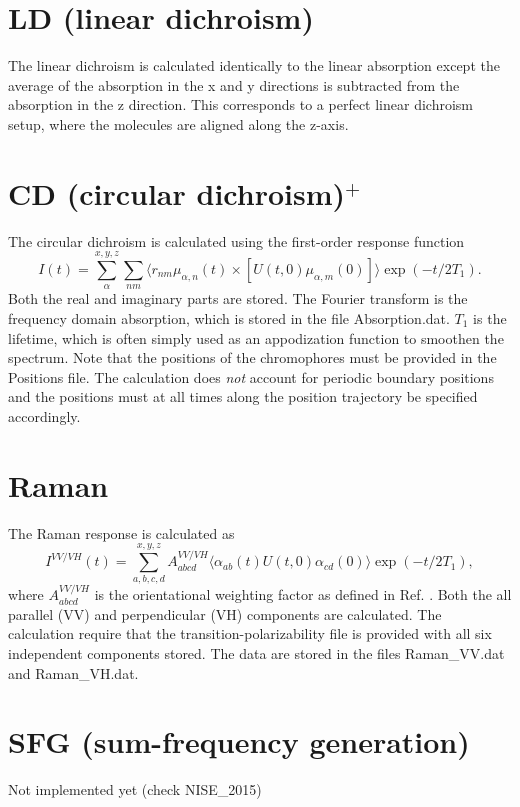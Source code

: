 \section{LD (linear dichroism)}
The linear dichroism is calculated identically to the linear absorption except the average of the absorption in the x and y directions is subtracted from the absorption in the z direction. This corresponds to a perfect linear dichroism setup, where the molecules are aligned along the z-axis.
\section{CD (circular dichroism)$^{+}$}
The circular dichroism is calculated using the first-order response function
\begin{equation}
	I(t)=\sum_{\alpha}^{x,y,z}\sum_{nm}\langle r_{nm}\mu_{\alpha,n}(t)\times[U(t,0)\mu_{\alpha,m}(0)]\rangle\exp(-t/2T_1).
\end{equation}
Both the real and imaginary parts are stored. The Fourier transform is the frequency domain absorption, which is stored in the file Absorption.dat. $T_1$ is the lifetime, which is often simply used as an appodization function to smoothen the spectrum. Note that the positions of the chromophores must be provided in the Positions file. The calculation does \textit{not} account for periodic boundary positions and the positions must at all times along the position trajectory be specified accordingly.
\section{Raman}
The Raman response is calculated as \cite{Torii.2002.J.Phys.Chem.A.106.3281,Shi.2012.J.Phys.Chem.B.116.13821}
\begin{equation}
        I^{VV/VH}(t)=\sum_{a,b,c,d}^{x,y,z}A^{VV/VH}_{abcd}\langle\alpha_{ab}(t)U(t,0)\alpha_{cd}(0)\rangle\exp(-t/2T_1),
\end{equation}
where $A^{VV/VH}_{abcd}$ is the orientational weighting factor as defined in Ref. . 
Both the all parallel (VV) and perpendicular (VH) components are calculated. The calculation require that the transition-polarizability file is provided with all six independent components stored. The data are stored in the files Raman\_VV.dat and Raman\_VH.dat.
\section{SFG (sum-frequency generation)}
Not implemented yet (check NISE\_2015)
